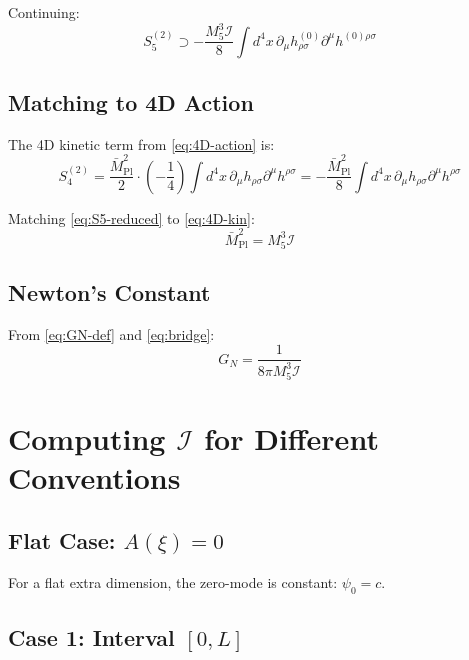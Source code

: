 \documentclass[11pt,a4paper]{article}
\newcommand{\Mplbar}{\bar{M}_{\mathrm{Pl}}}
\newcommand{\Mfive}{M_5}
\newcommand{\calI}{\mathcal{I}}
\newcommand{\GN}{G_N}
\begin{document}
Continuing:
\begin{equation}
S_5^{(2)} \supset -\frac{\Mfive^3 \calI}{8} \int d^4x\,
\partial_\mu h_{\rho\sigma}^{(0)} \partial^\mu h^{(0)\rho\sigma}
\label{eq:S5-reduced}
\end{equation}

\subsection{Matching to 4D Action}

The 4D kinetic term from \eqref{eq:4D-action} is:
\begin{equation}
S_4^{(2)} = \frac{\Mplbar^2}{2} \cdot \left( -\frac{1}{4} \right)
\int d^4x\, \partial_\mu h_{\rho\sigma} \partial^\mu h^{\rho\sigma}
= -\frac{\Mplbar^2}{8} \int d^4x\, \partial_\mu h_{\rho\sigma} \partial^\mu h^{\rho\sigma}
\label{eq:4D-kin}
\end{equation}

Matching \eqref{eq:S5-reduced} to \eqref{eq:4D-kin}:
\begin{equation}
\boxed{\Mplbar^2 = \Mfive^3 \calI}
\label{eq:bridge}
\end{equation}

\subsection{Newton's Constant}

From \eqref{eq:GN-def} and \eqref{eq:bridge}:
\begin{equation}
\boxed{\GN = \frac{1}{8\pi \Mfive^3 \calI}}
\label{eq:GN-bridge}
\end{equation}

\section{Computing $\calI$ for Different Conventions}

\subsection{Flat Case: $A(\xi) = 0$}

For a flat extra dimension, the zero-mode is constant: $\psi_0 = c$.

\subsection{Case 1: Interval $[0,L]$}
\end{document}
